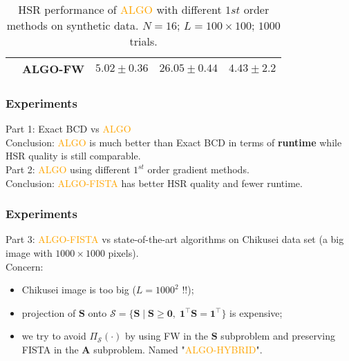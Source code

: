 \documentclass[10pt,mathserif]{beamer}
\newcommand{\Tr}{^\top}%
\begin{document}
\begin{frame}
\begin{table}[h]
{\begin{tabular}{|c|l|c|c|c|}
                            & ALGO-FW                     &                   {$5.02\pm 0.36$} &                   {$26.05\pm 0.44$} &                   {$4.43\pm 2.2$}   \tabularnewline \hline
        \end{tabular}
        }
        \caption{HSR performance of \textcolor{orange}{ALGO} with different
                 $1st$ order methods on synthetic data. $N = 16$;
                 $L = 100 \times 100$; $1000$ trials.}                                                                                            
        \label{table:ALGO_GP_BB_PG_FISTA_FW_vs_SYNT_MO9_MO16}
        \end{table}
    \end{frame}
    \begin{frame}
        \frametitle{Experiments}
        Part 1: Exact BCD vs \textcolor{orange}{ALGO} \\
        Conclusion: \textcolor{orange}{ALGO} is much better than Exact BCD in
                    terms of \textbf{runtime} while HSR quality is still
                    comparable. \\ 
        \vspace{1cm}
        Part 2: \textcolor{orange}{ALGO} using different $1^{st}$ order gradient methods. \\
        Conclusion: \textcolor{orange}{ALGO-FISTA} has better HSR quality and fewer runtime.
    \end{frame}
    \begin{frame}
        \frametitle{Experiments}
        Part 3: \textcolor{orange}{ALGO-FISTA} vs state-of-the-art algorithms
                on Chikusei data set (a big image with $1000 \times 1000$ pixels). \\
        \vspace{1.5cm}
        Concern:
        \begin{itemize}
            \item Chikusei image is too big ($L = 1000^2$ !!);
            \item projection of $\bm S$ onto
                  $\mathcal S = \{\bm S \; \vert \; \bm S \geq \bm 0, \; \bm 1\Tr \bm S = \bm 1\Tr\}$
                  is expensive;
            \item we try to avoid $\Pi_{\mathcal S}(\cdot)$ by using FW in the
                  $\bm S$ subproblem and preserving FISTA in the $\bm A$
                  subproblem.
                  Named "\textcolor{orange}{ALGO-HYBRID}".
        \end{itemize}
    \end{frame}
\end{document}
